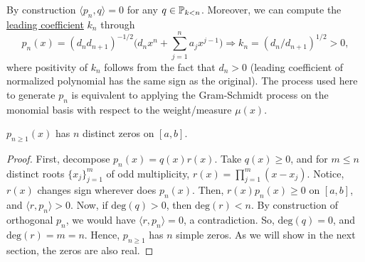 By construction $\langle p_n,q\rangle = 0$ for any $q \in \mathbb{P}_{k<n}$. Moreover, we can compute the \underline{leading coefficient} $k_n$ through \begin{equation}\label{eq:orthnormlead}
p_n(x)=(d_nd_{n+1})^{-1/2}\big(d_nx^n+ \sum_{j=1}^n a_jx^{j-1}\big)\Rightarrow k_n = (d_n/d_{n+1})^{1/2} > 0,
\end{equation}
where positivity of $k_n$ follows from the fact that $d_n > 0$ (leading coefficient of normalized polynomial has the same sign as the original). The process used here to generate $p_n$ is equivalent to applying the Gram-Schmidt process on the monomial basis with respect to the weight/measure $\mu(x)$.
\begin{theorem}\normalfont
$p_{n\geq 1}(x)$ has $n$ distinct zeros on $[a,b]$.
\end{theorem}
\begin{proof}
First, decompose $p_n(x) = q(x)r(x)$. Take $q(x) \geq 0$, and for $m\leq n$ distinct roots $\{x_j\}_{j=1}^m$ of odd multiplicity, $r(x) = \prod_{j=1}^m(x-x_j)$. Notice, $r(x)$ changes sign wherever does $p_n(x)$. Then, $r(x)p_n(x) \geq 0$ on $[a,b]$, and $\langle r,p_n\rangle > 0$. Now, if $\text{deg}(q) > 0$, then $\text{deg}(r) < n$. By construction of orthogonal $p_n$, we would have $\langle r, p_n\rangle = 0$, a contradiction. So, $\text{deg}(q) = 0$, and $\text{deg}(r) = m = n$. Hence, $p_{n\geq 1}$ has $n$ simple zeros. As we will show in the next section, the zeros are also real.
\end{proof}

